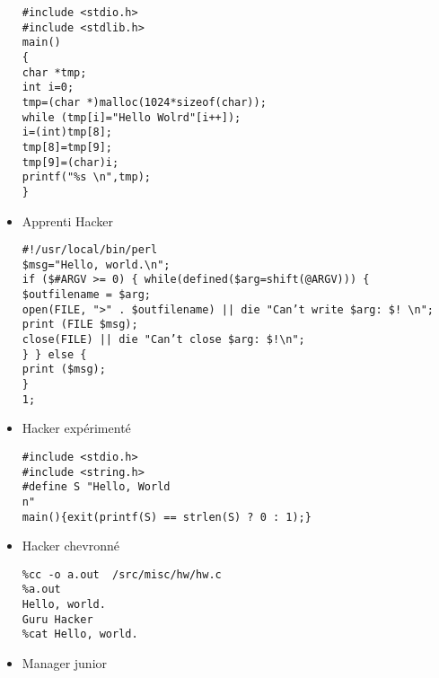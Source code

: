 \begin{itemize}
\texttt{\#include <stdio.h>\\
\#include <stdlib.h>\\
main()\\
\{\\
char *tmp;\\
int i=0;\\
tmp=(char *)malloc(1024*sizeof(char));\\
while (tmp[i]="Hello Wolrd"[i++]);\\
i=(int)tmp[8];\\
tmp[8]=tmp[9];\\
tmp[9]=(char)i;\\
printf("\%s \textbackslash n",tmp);\\
\}\\
}

	\item Apprenti Hacker

\texttt{\#!/usr/local/bin/perl\\
\$msg="Hello, world.\textbackslash n";\\
if (\$\#ARGV >= 0) \{
while(defined(\$arg=shift(@ARGV))) \{\\
\$outfilename = \$arg;\\
open(FILE, ">" . \$outfilename) || die "Can't write \$arg: \$! \textbackslash n";\\
print (FILE \$msg);\\
close(FILE) || die "Can't close \$arg: \$!\textbackslash n";\\
\}
\} else \{\\
print (\$msg);\\
\}\\
1;}

	\item Hacker expérimenté

\texttt{\#include <stdio.h>\\
\#include <string.h>\\
\#define S "Hello, World\\n"\\
main()\{exit(printf(S) == strlen(S) ? 0 : 1);\}}

	\item Hacker chevronné

\texttt{\%cc -o a.out ~/src/misc/hw/hw.c\\
\%a.out\\
Hello, world.\\
Guru Hacker\\
\%cat
Hello, world.}

	\item Manager junior


\end{itemize}
